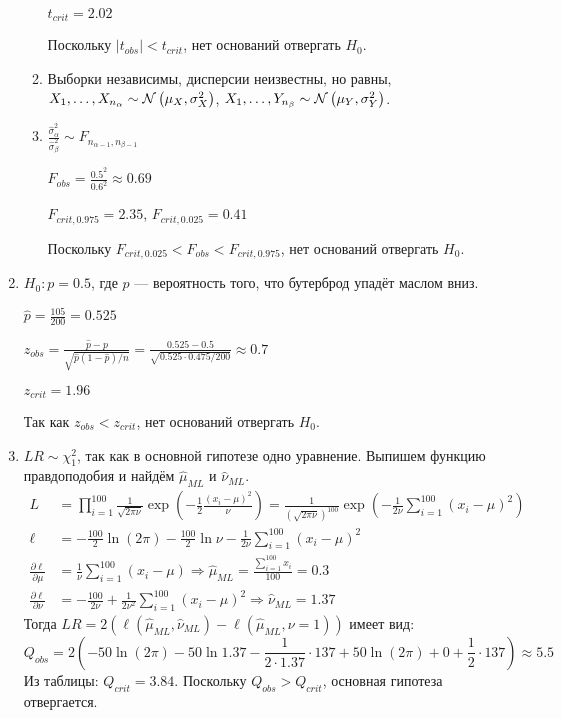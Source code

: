 \begin{enumerate}
\begin{enumerate}
$t_{crit} = 2.02$

Поскольку $\vert t_{obs} \vert < t_{crit}$, нет оснований отвергать $H_0$.
\item Выборки независимы, дисперсии неизвестны, но равны,
$X_1, \ldots, X_{n_\alpha} \sim \mathcal{N}\left(\mu_X, \sigma^2_X\right)$,
$X_1, \ldots, Y_{n_\beta} \sim \mathcal{N}\left(\mu_Y, \sigma^2_Y\right)$.
\item $\frac{\hat{\sigma}_\alpha^2}{\hat{\sigma}_\beta^2} \sim F_{n_{\alpha-1}, n_{\beta-1}}$

$F_{obs} = \frac{0.5^2}{0.6^2} \approx 0.69$

$F_{crit, 0.975} = 2.35$, $F_{crit, 0.025} = 0.41$

Поскольку $F_{crit, 0.025} < F_{obs} < F_{crit, 0.975}$, нет оснований отвергать $H_0$.
\end{enumerate}
\item $H_0: p = 0.5$, где $p$ — вероятность того, что бутерброд упадёт маслом вниз.

$\hat{p} = \frac{105}{200} = 0.525$

$z_{obs} = \frac{\hat p - p}{\sqrt{\hat p (1 - \hat p)/n}} = \frac{0.525-0.5}{\sqrt{0.525\cdot0.475/200}} \approx 0.7$

$z_{crit} = 1.96$

Так как $z_{obs} < z_{crit}$, нет оснований отвергать $H_0$.
\item $LR \sim \chi^2_1$, так как в основной гипотезе одно уравнение.
Выпишем функцию правдоподобия и найдём $\hat{\mu}_{ML}$ и $\hat{\nu}_{ML}$.
\begin{align*}
L &= \prod_{i=1}^{100} \frac{1}{\sqrt{2\pi\nu}} \exp\left(-\frac{1}{2} \frac{(x_i-\mu)^2}{\nu} \right) = \frac{1}{(\sqrt{2\pi\nu})^{100}} \exp \left(-\frac{1}{2\nu}\sum_{i=1}^{100} (x_i - \mu)^2 \right) \\
\ell &= -\frac{100}{2}\ln (2\pi) - \frac{100}{2} \ln \nu - \frac{1}{2\nu}\sum_{i=1}^{100} (x_i - \mu)^2 \\
\frac{\partial \ell}{\partial \mu} &= \frac{1}{\nu} \sum_{i=1}^{100} (x_i - \mu) \Rightarrow \hat{\mu}_{ML} = \frac{\sum_{i=1}^{100} x_i}{100} = 0.3 \\
\frac{\partial \ell}{\partial \nu} &= -\frac{100}{2\nu} + \frac{1}{2\nu^2}\sum_{i=1}^{100} (x_i - \mu)^2 \Rightarrow \hat{\nu}_{ML} = 1.37
\end{align*}
Тогда $LR=2(\ell(\hat{\mu}_{ML}, \hat{\nu}_{ML}) - \ell(\hat{\mu}_{ML}, \nu = 1))$ имеет вид:
\[
Q_{obs}= 2 \left(-50 \ln(2\pi) - 50 \ln 1.37 - \frac{1}{2\cdot1.37}\cdot 137 + 50 \ln(2\pi) + 0 + \frac{1}{2} \cdot 137 \right) \approx 5.5
\]
Из таблицы: $Q_{crit} = 3.84$. Поскольку $Q_{obs} > Q_{crit}$, основная гипотеза отвергается.
\end{enumerate}




